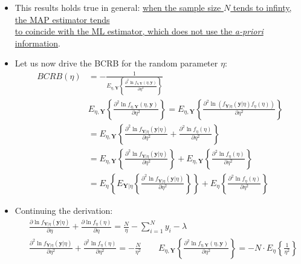 \begin{itemize}
\begin{align*}
N \gg 1 \quad &\rightarrow \quad \hat{\eta}_{MAP} = \frac{1}{Y_{SM} + \lambda/N} \approx \frac{1}{Y_{SM}} = \hat{\eta}_{ML} \\[15pt]
N \gg 1 \quad &\rightarrow \quad \hat{\alpha}_{MAP} = \frac{Y_{SM} + \lambda/N}{1 + 2/N} \approx Y_{SM} = \hat{\alpha}_{ML}
\end{align*}
\item This results holds true in general: \underline{when the sample size \(N\) tends to infinty, the MAP estimator tends}\\ \noindent \underline{to coincide with the ML estimator, which does not use the \textit{a-priori} information}.
\item Let us now drive the BCRB for the random parameter \(\eta\):
\begin{align*}
BCRB(\eta) &= - \frac{1}{E_{\eta,\mathbf{Y}} \left\{ \frac{\partial^2 \ln f_{\eta,\mathbf{Y}}(\eta,\mathbf{y})}{\partial \eta^2} \right\}} \\[15pt]
&E_{\eta,\mathbf{Y}} \left\{ \frac{\partial^2 \ln f_{\eta,\mathbf{Y}}(\eta,\mathbf{y})}{\partial \eta^2} \right\} = E_{\eta,\mathbf{Y}} \left\{ \frac{\partial^2 \ln (f_{\mathbf{Y}|\eta}(\mathbf{y}|\eta)f_\eta(\eta))}{\partial \eta^2} \right\} \\[15pt]
&= E_{\eta,\mathbf{Y}} \left\{ \frac{\partial^2 \ln f_{\mathbf{Y}|\eta}(\mathbf{y}|\eta)}{\partial \eta^2} + \frac{\partial^2 \ln f_\eta(\eta)}{\partial \eta^2} \right\} \\[10pt]
&= E_{\eta,\mathbf{Y}} \left\{ \frac{\partial^2 \ln f_{\mathbf{Y}|\eta}(\mathbf{y}|\eta)}{\partial \eta^2} \right\} + E_{\eta,\mathbf{Y}} \left\{ \frac{\partial^2 \ln f_\eta(\eta)}{\partial \eta^2} \right\} \\[10pt]
&= E_{\eta} \left\{ E_{\mathbf{Y}|\eta} \left\{ \frac{\partial^2 \ln f_{\mathbf{Y}|\eta}(\mathbf{y}|\eta)}{\partial \eta^2} \right\} \right\} + E_{\eta} \left\{ \frac{\partial^2 \ln f_\eta(\eta)}{\partial \eta^2} \right\}
\end{align*}
\item Continuing the derivation:
\begin{align*}
&\frac{\partial \ln f_{\mathbf{Y}|\eta}(\mathbf{y}|\eta)}{\partial \eta} + \frac{\partial \ln f_\eta(\eta)}{\partial \eta} = \frac{N}{\eta} - \sum_{i=1}^{N} y_i - \lambda \\[10pt]
&\frac{\partial^2 \ln f_{\mathbf{Y}|\eta}(\mathbf{y}|\eta)}{\partial \eta^2} + \frac{\partial^2 \ln f_\eta(\eta)}{\partial \eta^2} = - \frac{N}{\eta^2} \qquad E_{\eta,\mathbf{Y}} \left\{ \frac{\partial^2 \ln f_{\eta,\mathbf{Y}}(\eta,\mathbf{y})}{\partial \eta^2} \right\} = -N \cdot E_\eta \left\{ \frac{1}{\eta^2} \right\}

\end{align*}
\end{itemize}
